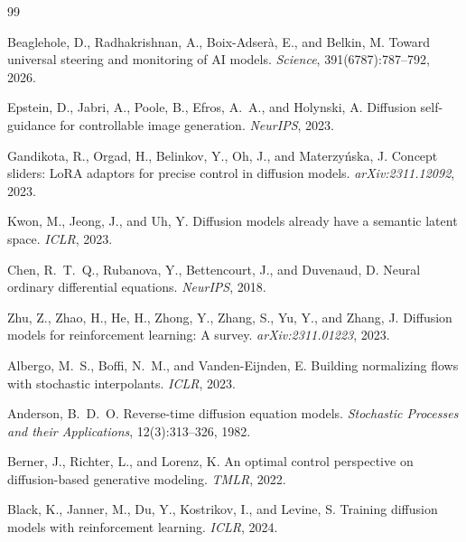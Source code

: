 \documentclass[11pt]{article}
\begin{document}

\begin{thebibliography}{99}

Beaglehole, D., Radhakrishnan, A., Boix-Adser\`{a}, E., and Belkin, M.
\newblock Toward universal steering and monitoring of {AI} models.
\newblock \emph{Science}, 391(6787):787--792, 2026.

Epstein, D., Jabri, A., Poole, B., Efros, A.~A., and Holynski, A.
\newblock Diffusion self-guidance for controllable image generation.
\newblock \emph{NeurIPS}, 2023.

Gandikota, R., Orgad, H., Belinkov, Y., Oh, J., and Materzy\'{n}ska, J.
\newblock Concept sliders: {LoRA} adaptors for precise control in diffusion models.
\newblock \emph{arXiv:2311.12092}, 2023.

Kwon, M., Jeong, J., and Uh, Y.
\newblock Diffusion models already have a semantic latent space.
\newblock \emph{ICLR}, 2023.

Chen, R.~T.~Q., Rubanova, Y., Bettencourt, J., and Duvenaud, D.
\newblock Neural ordinary differential equations.
\newblock \emph{NeurIPS}, 2018.

Zhu, Z., Zhao, H., He, H., Zhong, Y., Zhang, S., Yu, Y., and Zhang, J.
\newblock Diffusion models for reinforcement learning: A survey.
\newblock \emph{arXiv:2311.01223}, 2023.

Albergo, M.~S., Boffi, N.~M., and Vanden-Eijnden, E.
\newblock Building normalizing flows with stochastic interpolants.
\newblock \emph{ICLR}, 2023.

Anderson, B.~D.~O.
\newblock Reverse-time diffusion equation models.
\newblock \emph{Stochastic Processes and their Applications}, 12(3):313--326, 1982.

Berner, J., Richter, L., and Lorenz, K.
\newblock An optimal control perspective on diffusion-based generative modeling.
\newblock \emph{TMLR}, 2022.

Black, K., Janner, M., Du, Y., Kostrikov, I., and Levine, S.
\newblock Training diffusion models with reinforcement learning.
\newblock \emph{ICLR}, 2024.


\end{thebibliography}
\end{document}
